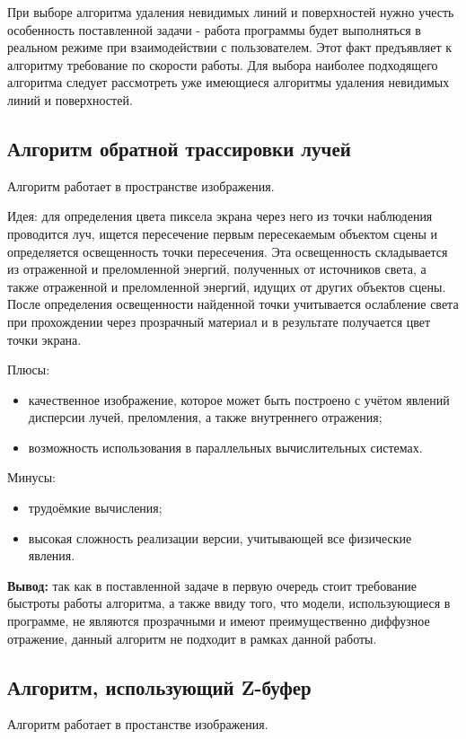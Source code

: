 При выборе алгоритма удаления невидимых линий и поверхностей нужно учесть особенность поставленной задачи - работа программы будет выполняться в реальном режиме при взаимодействии с пользователем. Этот факт предъявляет к алгоритму требование по скорости работы. Для выбора наиболее подходящего алгоритма следует рассмотреть уже имеющиеся алгоритмы удаления невидимых линий и поверхностей.

\subsection{Алгоритм обратной трассировки лучей}
Алгоритм работает в пространстве изображения.

Идея: для определения цвета пиксела экрана через него из точки наблюдения проводится луч, ищется пересечение первым пересекаемым объектом сцены и определяется освещенность точки пересечения. Эта освещенность складывается из отраженной и преломленной энергий, полученных от источников света, а также отраженной и преломленной энергий, идущих от других объектов сцены. После определения освещенности найденной точки учитывается ослабление света при прохождении через прозрачный материал и в результате получается цвет точки экрана.

Плюсы:
\begin{itemize}
    \item качественное изображение, которое может быть построено с учётом явлений дисперсии лучей, преломления, а также внутреннего отражения;
    \item возможность использования в параллельных вычислительных системах.
\end{itemize}

Минусы:
\begin{itemize}
    \item трудоёмкие вычисления;
    \item высокая сложность реализации версии, учитывающей все физические явления.
\end{itemize}

\textbf{Вывод:} так как в поставленной задаче в первую очередь стоит требование быстроты работы алгоритма, а также ввиду того, что модели, использующиеся в программе, не являются прозрачными и имеют преимущественно диффузное отражение, данный алгоритм не подходит в рамках данной работы.

\subsection{Алгоритм, использующий Z-буфер}
Алгоритм работает в простанстве изображения.

